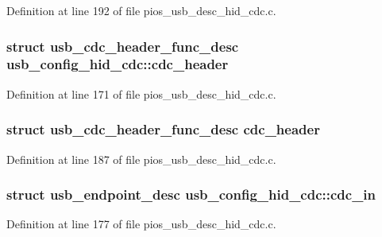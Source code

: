 Definition at line 192 of file pios\-\_\-usb\-\_\-desc\-\_\-hid\-\_\-cdc.\-c.

\hypertarget{group___p_i_o_s___u_s_b___d_e_s_c_gaedeb1a14bf5f0cfea7d70e97389205c8}{
\subsubsection[{cdc\-\_\-header}]{\setlength{\rightskip}{0pt plus 5cm}struct {\bf usb\-\_\-cdc\-\_\-header\-\_\-func\-\_\-desc} usb\-\_\-config\-\_\-hid\-\_\-cdc\-::cdc\-\_\-header}}\label{group___p_i_o_s___u_s_b___d_e_s_c_gaedeb1a14bf5f0cfea7d70e97389205c8}


Definition at line 171 of file pios\-\_\-usb\-\_\-desc\-\_\-hid\-\_\-cdc.\-c.

\hypertarget{group___p_i_o_s___u_s_b___d_e_s_c_gaf41f2d1d7fbf8850ddc7ca678ca183aa}{
\subsubsection[{cdc\-\_\-header}]{\setlength{\rightskip}{0pt plus 5cm}struct {\bf usb\-\_\-cdc\-\_\-header\-\_\-func\-\_\-desc} cdc\-\_\-header}}\label{group___p_i_o_s___u_s_b___d_e_s_c_gaf41f2d1d7fbf8850ddc7ca678ca183aa}


Definition at line 187 of file pios\-\_\-usb\-\_\-desc\-\_\-hid\-\_\-cdc.\-c.

\hypertarget{group___p_i_o_s___u_s_b___d_e_s_c_ga599b79ff75341552732decb7763cc6c8}{
\subsubsection[{cdc\-\_\-in}]{\setlength{\rightskip}{0pt plus 5cm}struct {\bf usb\-\_\-endpoint\-\_\-desc} usb\-\_\-config\-\_\-hid\-\_\-cdc\-::cdc\-\_\-in}}\label{group___p_i_o_s___u_s_b___d_e_s_c_ga599b79ff75341552732decb7763cc6c8}


Definition at line 177 of file pios\-\_\-usb\-\_\-desc\-\_\-hid\-\_\-cdc.\-c.

